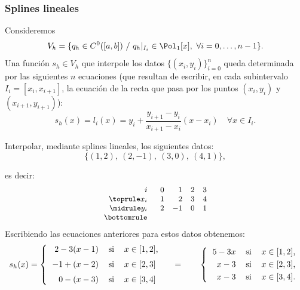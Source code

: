\subsubsection{Splines lineales}
\label{sec:splines-lineales}

Consideremos
\begin{equation*}
  V_h = \{q_h \in C^{0}([a,b])\ / \ q_h|_{I_i}\in  \Pol_1[x],\ \forall i=0,\dots,n-1\}.
\end{equation*}
Una función $s_h\in V_h$ que interpole los datos
$\{(x_i,y_i)\}_{i=0}^n$ queda determinada por las siguientes $n$
ecuaciones (que resultan de escribir, en cada subintervalo $I_i=[x_i,
x_{i+1}]$, la ecuación de la recta que pasa por los puntos
$(x_i,y_i)$ y $(x_{i+1},y_{i+1})$):
\begin{equation*}
  \label{eq:splines-lineales-1}
  s_h(x) = l_i(x) = y_i + \frac{y_{i+1}-y_i}{x_{i+1}-x_i}(x-x_i) \quad
  \forall x\in I_i.
\end{equation*}

\begin{example}
  \label{ex:splines-lineales-1}
  Interpolar, mediante splines lineales, los siguientes
  datos:
  \begin{equation*}
    \{ (1,2),\ (2,-1),\ (3,0),\ (4,1) \},
  \end{equation*}
\end{example}
es decir:
\begin{equation}
  \small
  \begin{array}{r@{\rule{4ex}{0pt}}rrrcr}
    i & 0 & 1 & 2 & 3
    \\ \toprule %
    x_i & 1 & 2 & 3 & 4
    \\ \midrule
    y_i & 2 & -1 & 0  & 1
    \\
    \bottomrule
  \end{array}
  \label{eq:tabla-datos-lagrange-splines}
\end{equation}
Escribiendo las ecuaciones anteriores para estos datos obtenemos:
\begin{equation*}
  s_h(x)=\left\{
    \begin{tabular}{rll}
      $2 -3 (x-1)$ & si & $x\in[1,2]$,
      \\\noalign{\medskip}
      $-1 + (x-2)$ & si & $x\in[2,3]$
      \\\noalign{\medskip}
      $0 - (x-3)$ & si & $x\in[3,4]$
    \end{tabular} \right.
  \quad=\qquad
  \left\{
    \begin{tabular}{rll}
      $5 -3x$ & si & $x\in[1,2]$,
      \\\noalign{\smallskip}
      $x-3$ & si & $x\in[2,3]$,
      \\\noalign{\smallskip}
      $x-3$ & si & $x\in[3,4]$.
    \end{tabular} \right.
\end{equation*}

